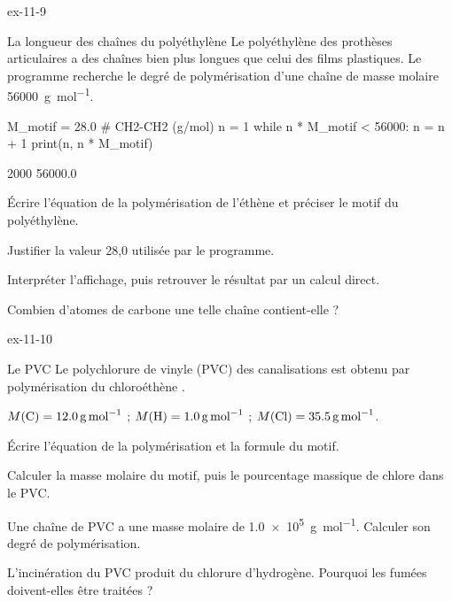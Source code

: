 \begin{blocLivre}{ex-11-9}
\begin{exercice}[2]{La longueur des chaînes du polyéthylène}
Le polyéthylène des prothèses articulaires a des chaînes bien plus longues que celui des films plastiques. Le
programme recherche le degré de polymérisation d'une chaîne de masse molaire \qty{56000}{g.mol^{-1}}.
\begin{python}
M_motif = 28.0        # CH2-CH2 (g/mol)
n = 1
while n * M_motif < 56000:
    n = n + 1
print(n, n * M_motif)
\end{python}
\begin{console}
2000 56000.0
\end{console}
\begin{questions}
\item {}Écrire l'équation de la polymérisation de l'éthène  et préciser le
motif du polyéthylène.
\item Justifier la valeur 28,0 utilisée par le programme.
\item Interpréter l'affichage, puis retrouver le résultat par un calcul direct.
\item Combien d'atomes de carbone une telle chaîne contient-elle ?
\end{questions}
\end{exercice}
\end{blocLivre}
\begin{blocLivre}{ex-11-10}
\begin{exercice}[2]{Le PVC}
Le polychlorure de vinyle (PVC) des canalisations est obtenu par polymérisation du chloroéthène .
\begin{donnees}
$M(\ce{C})=\qty{12,0}{g.mol^{-1}}$ ; $M(\ce{H})=\qty{1,0}{g.mol^{-1}}$ ; $M(\ce{Cl})=\qty{35,5}{g.mol^{-1}}$.
\end{donnees}
\begin{questions}
\item Écrire l'équation de la polymérisation et la formule du motif.
\item Calculer la masse molaire du motif, puis le pourcentage massique de chlore dans le PVC.
\item Une chaîne de PVC a une masse molaire de \qty{1,0e5}{g.mol^{-1}}. Calculer son degré de polymérisation.
\item L'incinération du PVC produit du chlorure d'hydrogène. Pourquoi les fumées doivent-elles être traitées ?
\end{questions}
\end{exercice}
\end{blocLivre}

